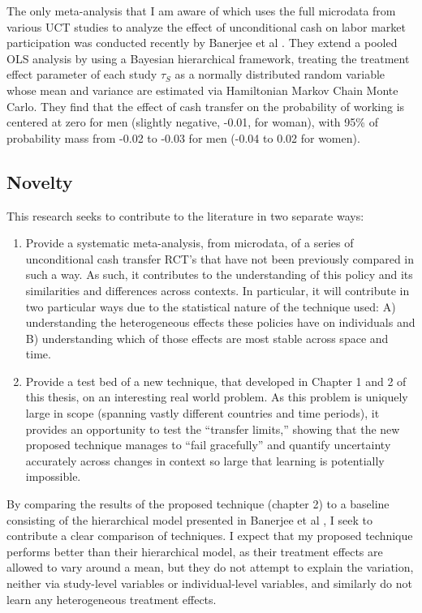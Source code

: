 \documentclass[a4paper,12pt]{article}
\begin{document}
The only meta-analysis that I am aware of which uses the full microdata from various UCT studies to analyze the effect of unconditional cash on labor market participation was conducted recently by Banerjee et al \parencite*{Banerjee2017}. They extend a pooled OLS analysis by using a Bayesian hierarchical framework, treating the treatment effect parameter of each study $\tau_S$ as a normally distributed random variable whose mean and variance are estimated via Hamiltonian Markov Chain Monte Carlo. They find that the effect of cash transfer on the probability of working is centered at zero for men (slightly negative, -0.01, for woman), with 95\% of probability mass from -0.02 to -0.03 for men (-0.04 to 0.02 for women).

\subsection{ Novelty }

This research seeks to contribute to the literature in two separate ways:

\begin{enumerate}
\item Provide a systematic meta-analysis, from microdata, of a series of unconditional cash transfer RCT's that have not been previously compared in such a way. As such, it contributes to the understanding of this policy and its similarities and differences across contexts. In particular, it will contribute in two particular ways due to the statistical nature of the technique used: A) understanding the heterogeneous effects these policies have on individuals and B) understanding which of those effects are most stable across space and time.

\item Provide a test bed of a new technique, that developed in Chapter 1 and 2 of this thesis, on an interesting real world problem. As this problem is uniquely large in scope (spanning vastly different countries and time periods), it provides an opportunity to test the ``transfer limits,'' showing that the new proposed technique manages to ``fail gracefully'' and quantify uncertainty accurately across changes in context so large that learning is potentially impossible.
\end{enumerate}

By comparing the results of the proposed technique (chapter 2) to a baseline consisting of the hierarchical model presented in Banerjee et al \parencite*{Banerjee2017}, I seek to contribute a clear comparison of techniques. I expect that my proposed technique performs better than their hierarchical model, as their treatment effects are allowed to vary around a mean, but they do not attempt to explain the variation, neither via study-level variables or individual-level variables, and similarly do not learn any heterogeneous treatment effects.
\end{document}
